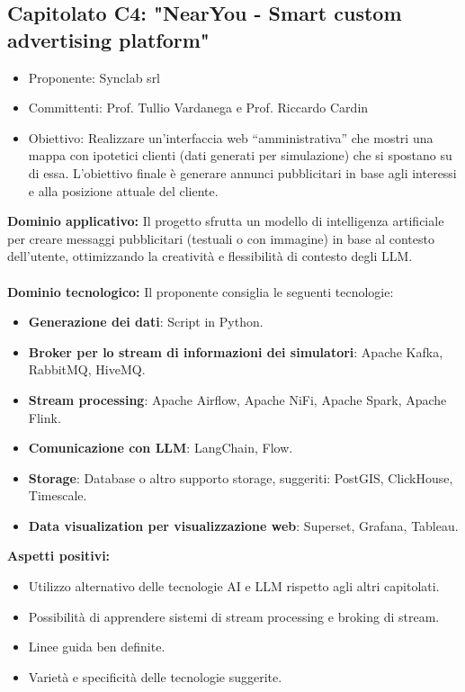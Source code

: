 \documentclass[10pt]{article}
\begin{document}
\subsection{Capitolato C4: "NearYou - Smart custom advertising platform"}
\begin{itemize}
    \item Proponente: Synclab srl
    \item Committenti: Prof. Tullio Vardanega e Prof. Riccardo Cardin
    \item Obiettivo: Realizzare un'interfaccia web “amministrativa” che mostri una mappa con ipotetici clienti (dati generati per simulazione) che si spostano su di essa. L’obiettivo finale è generare annunci pubblicitari in base agli interessi e alla posizione attuale del cliente.
\end{itemize}
\textbf{Dominio applicativo:}
Il progetto sfrutta un modello di intelligenza artificiale per creare messaggi pubblicitari (testuali o con immagine) in base al contesto dell’utente, ottimizzando la creatività e flessibilità di contesto degli LLM.\\
\\
\textbf{Dominio tecnologico:}  
Il proponente consiglia le seguenti tecnologie:
\begin{itemize}
    \item \textbf{Generazione dei dati}: Script in Python.
    \item \textbf{Broker per lo stream di informazioni dei simulatori}: Apache Kafka, RabbitMQ, HiveMQ.
    \item \textbf{Stream processing}: Apache Airflow, Apache NiFi, Apache Spark, Apache Flink.
    \item \textbf{Comunicazione con LLM}: LangChain, Flow.
    \item \textbf{Storage}: Database o altro supporto storage, suggeriti: PostGIS, ClickHouse, Timescale.
    \item \textbf{Data visualization per visualizzazione web}: Superset, Grafana, Tableau.
\end{itemize}
\textbf{Aspetti positivi:}
\begin{itemize}
    \item Utilizzo alternativo delle tecnologie AI e LLM rispetto agli altri capitolati.
    \item Possibilità di apprendere sistemi di stream processing e broking di stream.
    \item Linee guida ben definite.
    \item Varietà e specificità delle tecnologie suggerite.
\end{itemize}
\end{document}
